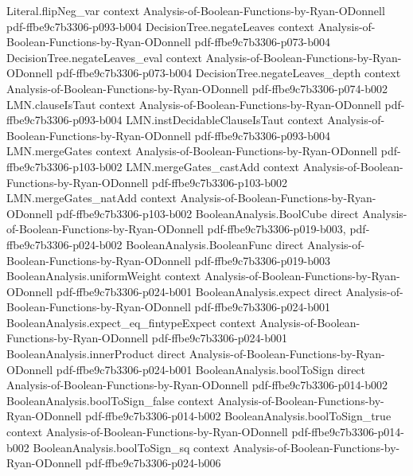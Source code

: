 \begin{theorem}
\proofstep
  {Literal.flipNeg_var}
  {context}
  {Analysis-of-Boolean-Functions-by-Ryan-ODonnell}
  {pdf-ffbe9c7b3306-p093-b004}
\proofstep
  {DecisionTree.negateLeaves}
  {context}
  {Analysis-of-Boolean-Functions-by-Ryan-ODonnell}
  {pdf-ffbe9c7b3306-p073-b004}
\proofstep
  {DecisionTree.negateLeaves_eval}
  {context}
  {Analysis-of-Boolean-Functions-by-Ryan-ODonnell}
  {pdf-ffbe9c7b3306-p073-b004}
\proofstep
  {DecisionTree.negateLeaves_depth}
  {context}
  {Analysis-of-Boolean-Functions-by-Ryan-ODonnell}
  {pdf-ffbe9c7b3306-p074-b002}
\proofstep
  {LMN.clauseIsTaut}
  {context}
  {Analysis-of-Boolean-Functions-by-Ryan-ODonnell}
  {pdf-ffbe9c7b3306-p093-b004}
\proofstep
  {LMN.instDecidableClauseIsTaut}
  {context}
  {Analysis-of-Boolean-Functions-by-Ryan-ODonnell}
  {pdf-ffbe9c7b3306-p093-b004}
\proofstep
  {LMN.mergeGates}
  {context}
  {Analysis-of-Boolean-Functions-by-Ryan-ODonnell}
  {pdf-ffbe9c7b3306-p103-b002}
\proofstep
  {LMN.mergeGates_castAdd}
  {context}
  {Analysis-of-Boolean-Functions-by-Ryan-ODonnell}
  {pdf-ffbe9c7b3306-p103-b002}
\proofstep
  {LMN.mergeGates_natAdd}
  {context}
  {Analysis-of-Boolean-Functions-by-Ryan-ODonnell}
  {pdf-ffbe9c7b3306-p103-b002}
\proofstep
  {BooleanAnalysis.BoolCube}
  {direct}
  {Analysis-of-Boolean-Functions-by-Ryan-ODonnell}
  {pdf-ffbe9c7b3306-p019-b003,
    pdf-ffbe9c7b3306-p024-b002}
\proofstep
  {BooleanAnalysis.BooleanFunc}
  {direct}
  {Analysis-of-Boolean-Functions-by-Ryan-ODonnell}
  {pdf-ffbe9c7b3306-p019-b003}
\proofstep
  {BooleanAnalysis.uniformWeight}
  {context}
  {Analysis-of-Boolean-Functions-by-Ryan-ODonnell}
  {pdf-ffbe9c7b3306-p024-b001}
\proofstep
  {BooleanAnalysis.expect}
  {direct}
  {Analysis-of-Boolean-Functions-by-Ryan-ODonnell}
  {pdf-ffbe9c7b3306-p024-b001}
\proofstep
  {BooleanAnalysis.expect_eq_fintypeExpect}
  {context}
  {Analysis-of-Boolean-Functions-by-Ryan-ODonnell}
  {pdf-ffbe9c7b3306-p024-b001}
\proofstep
  {BooleanAnalysis.innerProduct}
  {direct}
  {Analysis-of-Boolean-Functions-by-Ryan-ODonnell}
  {pdf-ffbe9c7b3306-p024-b001}
\proofstep
  {BooleanAnalysis.boolToSign}
  {direct}
  {Analysis-of-Boolean-Functions-by-Ryan-ODonnell}
  {pdf-ffbe9c7b3306-p014-b002}
\proofstep
  {BooleanAnalysis.boolToSign_false}
  {context}
  {Analysis-of-Boolean-Functions-by-Ryan-ODonnell}
  {pdf-ffbe9c7b3306-p014-b002}
\proofstep
  {BooleanAnalysis.boolToSign_true}
  {context}
  {Analysis-of-Boolean-Functions-by-Ryan-ODonnell}
  {pdf-ffbe9c7b3306-p014-b002}
\proofstep
  {BooleanAnalysis.boolToSign_sq}
  {context}
  {Analysis-of-Boolean-Functions-by-Ryan-ODonnell}
  {pdf-ffbe9c7b3306-p024-b006}

\end{theorem}
